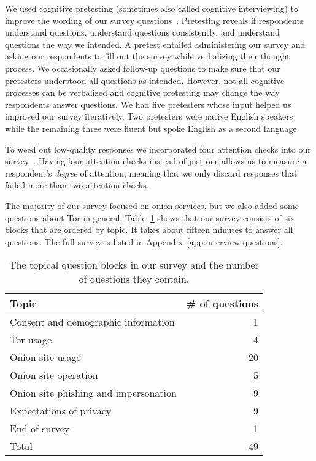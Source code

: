 We used cognitive pretesting (sometimes also called cognitive interviewing) to
improve the wording of our survey questions~\cite{Collins2003a}.  Pretesting
reveals if respondents \first understand questions, \second understand questions
consistently, and \third understand questions the way we intended.  A pretest
entailed administering our survey and asking our respondents to fill out the
survey while verbalizing their thought process.  We occasionally asked follow-up
questions to make sure that our pretesters understood all questions as intended.
However, not all cognitive processes can be verbalized and cognitive pretesting
may change the way respondents answer questions.  We had five pretesters whose
input helped us improved our survey iteratively.  Two pretesters were native
English speakers while the remaining three were fluent but spoke English as a
second language.

To weed out low-quality responses we incorporated four attention checks into our
survey~\cite{Berinsky2014a}.  Having four attention checks instead of just one
allows us to measure a respondent's \emph{degree} of attention, meaning that we
only discard responses that failed more than two attention checks.

The majority of our survey focused on onion services, but we also added some
questions about Tor in general.  Table~\ref{tab:survey-structure} shows that our
survey consists of six blocks that are ordered by topic.  It takes about fifteen
minutes to answer all questions.  The full survey is listed in
Appendix~\ref{app:interview-questions}.

\begin{table}[t]
	\centering
	\begin{tabular}{l r}
	\toprule
	Topic & \# of questions \\
	\midrule
	Consent and demographic information & 1 \\
	Tor usage & 4 \\
	Onion site usage & 20 \\
	Onion site operation & 5 \\
	Onion site phishing and impersonation & 9 \\
	Expectations of privacy & 9 \\
	End of survey & 1 \\
	\midrule
	Total & 49 \\
	\bottomrule
	\end{tabular}
	\caption{The topical question blocks in our survey and the number of
	questions they contain.}
	\label{tab:survey-structure}
\end{table}

